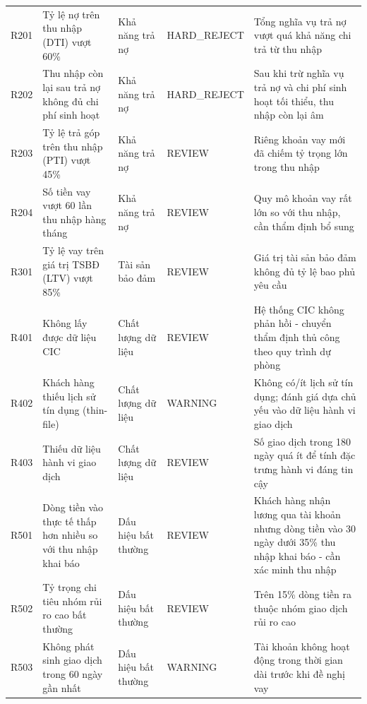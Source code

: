\begin{longtable}{@{}L{1.436cm}L{3.638cm}L{2.393cm}L{2.400cm}L{4.308cm}@{}}
R201 & Tỷ lệ nợ trên thu nhập (DTI) vượt 60\% & Khả năng trả nợ & HARD\_\allowbreak REJECT & Tổng nghĩa vụ trả nợ vượt quá khả năng chi trả từ thu nhập \\
R202 & Thu nhập còn lại sau trả nợ không đủ chi phí sinh hoạt & Khả năng trả nợ & HARD\_\allowbreak REJECT & Sau khi trừ nghĩa vụ trả nợ và chi phí sinh hoạt tối thiểu, thu nhập còn lại âm \\
R203 & Tỷ lệ trả góp trên thu nhập (PTI) vượt 45\% & Khả năng trả nợ & REVIEW & Riêng khoản vay mới đã chiếm tỷ trọng lớn trong thu nhập \\
R204 & Số tiền vay vượt 60 lần thu nhập hàng tháng & Khả năng trả nợ & REVIEW & Quy mô khoản vay rất lớn so với thu nhập, cần thẩm định bổ sung \\
R301 & Tỷ lệ vay trên giá trị TSBĐ (LTV) vượt 85\% & Tài sản bảo đảm & REVIEW & Giá trị tài sản bảo đảm không đủ tỷ lệ bao phủ yêu cầu \\
R401 & Không lấy được dữ liệu CIC & Chất lượng dữ liệu & REVIEW & Hệ thống CIC không phản hồi - chuyển thẩm định thủ công theo quy trình dự phòng \\
R402 & Khách hàng thiếu lịch sử tín dụng (thin-file) & Chất lượng dữ liệu & WARNING & Không có/ít lịch sử tín dụng; đánh giá dựa chủ yếu vào dữ liệu hành vi giao dịch \\
R403 & Thiếu dữ liệu hành vi giao dịch & Chất lượng dữ liệu & REVIEW & Số giao dịch trong 180 ngày quá ít để tính đặc trưng hành vi đáng tin cậy \\
R501 & Dòng tiền vào thực tế thấp hơn nhiều so với thu nhập khai báo & Dấu hiệu bất thường & REVIEW & Khách hàng nhận lương qua tài khoản nhưng dòng tiền vào 30 ngày dưới 35\% thu nhập khai báo - cần xác minh thu nhập \\
R502 & Tỷ trọng chi tiêu nhóm rủi ro cao bất thường & Dấu hiệu bất thường & REVIEW & Trên 15\% dòng tiền ra thuộc nhóm giao dịch rủi ro cao \\
R503 & Không phát sinh giao dịch trong 60 ngày gần nhất & Dấu hiệu bất thường & WARNING & Tài khoản không hoạt động trong thời gian dài trước khi đề nghị vay \\
\end{longtable}
\endgroup
